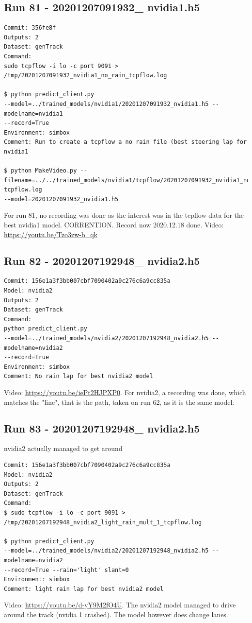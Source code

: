 \subsection{Run 81 - 20201207091932\_ nvidia1.h5}
\label{app_res:81}
\begin{verbatim}
Commit: 356fe8f 
Outputs: 2
Dataset: genTrack
Command:
sudo tcpflow -i lo -c port 9091 > /tmp/20201207091932_nvidia1_no_rain_tcpflow.log

$ python predict_client.py
--model=../trained_models/nvidia1/20201207091932_nvidia1.h5 --modelname=nvidia1 
--record=True
Environment: simbox
Comment: Run to create a tcpflow a no rain file (best steering lap for nvidia1

$ python MakeVideo.py --filename=../../trained_models/nvidia1/tcpflow/20201207091932_nvidia1_no_rain_
tcpflow.log 
--model=20201207091932_nvidia1.h5

\end{verbatim}
For run 81, no recording was done as the interest was in the tcpflow data for the best nvidia1 model. CORRENTION. Record now 2020.12.18 done.
Video: \url{https://youtu.be/Tzo3zw-b_qk}
\subsection{Run 82 - 20201207192948\_ nvidia2.h5 }
\label{app_res:82}
\begin{verbatim}
Commit: 156e1a3f3bb007cbf7090402a9c276c6a9cc835a
Model: nvidia2 
Outputs: 2
Dataset: genTrack
Command:
python predict_client.py
--model=../trained_models/nvidia2/20201207192948_nvidia2.h5 --modelname=nvidia2 
--record=True
Environment: simbox
Comment: No rain lap for best nvidia2 model

\end{verbatim}
Video: \url{https://youtu.be/iePt2HJPXP0}. 
For nvidia2, a recording was done, which matches the "line", that is the path, taken on run 62, as it is the same model.

\subsection{Run 83 - 20201207192948\_ nvidia2.h5 }
nvidia2 actually managed to get around
\label{app_res:83}
\begin{verbatim}
Commit: 156e1a3f3bb007cbf7090402a9c276c6a9cc835a
Model: nvidia2 
Outputs: 2
Dataset: genTrack
Command:
$ sudo tcpflow -i lo -c port 9091 > 
/tmp/20201207192948_nvidia2_light_rain_mult_1_tcpflow.log

$ python predict_client.py
--model=../trained_models/nvidia2/20201207192948_nvidia2.h5 --modelname=nvidia2 
--record=True --rain='light' slant=0
Environment: simbox
Comment: light rain lap for best nvidia2 model
\end{verbatim}
Video: \url{https://youtu.be/d-yY9M2fO4U}. The nvidia2 model managed to drive around the track (nvidia 1 crashed). The model however does change lanes.

